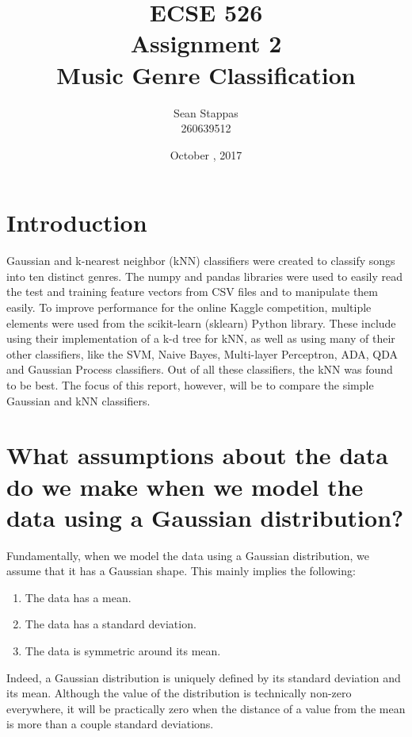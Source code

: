 \documentclass[a4paper,titlepage]{article}
\title{
	\textbf{ECSE 526 \\ Assignment 2}
	\\ \large Music Genre Classification
}
\author{Sean Stappas \\ 260639512}
\date{October \nth{19}, 2017}
\begin{document}
	\sloppy
	\maketitle
	\twocolumn
	
	\section*{Introduction}
	
	Gaussian and k-nearest neighbor (kNN) classifiers were created to classify songs into ten distinct genres. The numpy and pandas libraries were used to easily read the test and training feature vectors from CSV files and to manipulate them easily. To improve performance for the online Kaggle competition, multiple elements were used from the scikit-learn (sklearn) Python library. These include using their implementation of a k-d tree for kNN, as well as using many of their other classifiers, like the SVM, Naive Bayes, Multi-layer Perceptron, ADA, QDA and Gaussian Process classifiers. Out of all these classifiers, the kNN was found to be best. The focus of this report, however, will be to compare the simple Gaussian and kNN classifiers.
	
	\section{What assumptions about the data do we make when we model the data using a Gaussian distribution?}
	
	Fundamentally, when we model the data using a Gaussian distribution, we assume that it has a Gaussian shape. This mainly implies the following:
	
	\begin{enumerate}
		\item The data has a mean.
		\item The data has a standard deviation.
		\item The data is symmetric around its mean.
	\end{enumerate}
	
	Indeed, a Gaussian distribution is uniquely defined by its standard deviation and its mean. Although the value of the distribution is technically non-zero everywhere, it will be practically zero when the distance of a value from the mean is more than a couple standard deviations.
	
\end{document}
